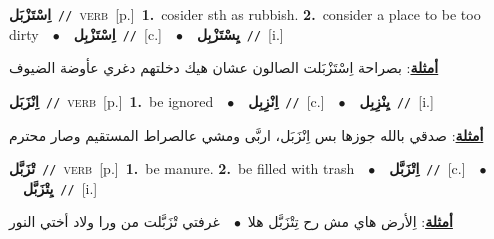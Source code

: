 \documentclass[10pt,a4paper,twoside]{article} %
\begin{document}
\begin{multicols}{2}
{\setlength\topsep{0pt}\textbf{\foreignlanguage{arabic}{اِسْتَزْبَل}}\ {\color{gray}\texttt{//}\color{black}}\ \textsc{verb}\ [p.]\ \textbf{1.}~cosider sth as rubbish.  \textbf{2.}~consider a place to be too dirty\ \ $\bullet$\ \ \setlength\topsep{0pt}\textbf{\foreignlanguage{arabic}{اِسْتَزْبِل}}\ {\color{gray}\texttt{//}\color{black}}\ [c.]\ \ $\bullet$\ \ \setlength\topsep{0pt}\textbf{\foreignlanguage{arabic}{يِسْتَزْبِل}}\ {\color{gray}\texttt{//}\color{black}}\ [i.]\  \begin{flushright}\color{gray}\foreignlanguage{arabic}{\textbf{\underline{\foreignlanguage{arabic}{أمثلة}}}: بصراحة اِسْتَزْبَلت الصالون عشان هيك دخلتهم دغري عأوضة الضيوف}\end{flushright}\color{black}} \vspace{2mm}

{\setlength\topsep{0pt}\textbf{\foreignlanguage{arabic}{اِنْزَبَل}}\ {\color{gray}\texttt{//}\color{black}}\ \textsc{verb}\ [p.]\ \textbf{1.}~be ignored\ \ $\bullet$\ \ \setlength\topsep{0pt}\textbf{\foreignlanguage{arabic}{اِنْزِبِل}}\ {\color{gray}\texttt{//}\color{black}}\ [c.]\ \ $\bullet$\ \ \setlength\topsep{0pt}\textbf{\foreignlanguage{arabic}{يِنْزِبِل}}\ {\color{gray}\texttt{//}\color{black}}\ [i.]\  \begin{flushright}\color{gray}\foreignlanguage{arabic}{\textbf{\underline{\foreignlanguage{arabic}{أمثلة}}}: صدقي بالله جوزها بس اِنْزَبَل، اربَّى ومشي عالصراط المستقيم وصار محترم}\end{flushright}\color{black}} \vspace{2mm}

{\setlength\topsep{0pt}\textbf{\foreignlanguage{arabic}{تْزَبَّل}}\ {\color{gray}\texttt{//}\color{black}}\ \textsc{verb}\ [p.]\ \textbf{1.}~be manure.  \textbf{2.}~be filled with trash\ \ $\bullet$\ \ \setlength\topsep{0pt}\textbf{\foreignlanguage{arabic}{اِتْزَبَّل}}\ {\color{gray}\texttt{//}\color{black}}\ [c.]\ \ $\bullet$\ \ \setlength\topsep{0pt}\textbf{\foreignlanguage{arabic}{يِتْزَبَّل}}\ {\color{gray}\texttt{//}\color{black}}\ [i.]\  \begin{flushright}\color{gray}\foreignlanguage{arabic}{\textbf{\underline{\foreignlanguage{arabic}{أمثلة}}}: اِلأرض هاي مش رح تِتْزَبَّل هلا\ $\bullet$\ \  غرفتي  تْزَبَّلت من ورا ولاد أختي النور}\end{flushright}\color{black}} \vspace{2mm}


\end{multicols}
\end{document}
